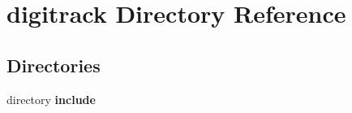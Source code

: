 \section{digitrack Directory Reference}
\label{dir_e07cc7ffdc6edca9b490b6065d42ebac}
\subsection*{Directories}
\begin{DoxyCompactItemize}
\item 
directory {\bf include}
\end{DoxyCompactItemize}
